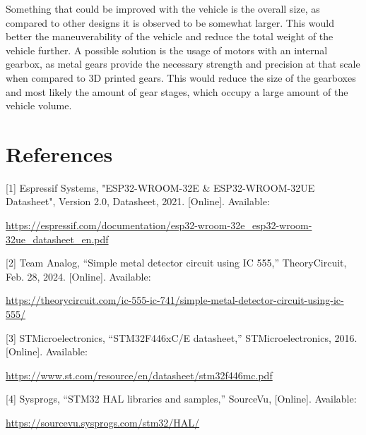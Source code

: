 \documentclass[11pt]{article}
\begin{document}
Something that could be improved with the vehicle is the overall size, as compared to other designs it is observed to be somewhat larger. This would better the maneuverability of the vehicle and reduce the total weight of the vehicle further. A possible solution is the usage of motors with an internal gearbox, as metal gears provide the necessary strength and precision at that scale when compared to 3D printed gears. This would reduce the size of the gearboxes and most likely the amount of gear stages, which occupy a large amount of the vehicle volume.

\newpage

\section{References}
[1] Espressif Systems, "ESP32-WROOM-32E \& ESP32-WROOM-32UE Datasheet", Version 2.0, Datasheet, 2021. [Online]. Available:
\vspace{-.5\baselineskip}

\href{https://espressif.com/documentation/esp32-wroom-32e_esp32-wroom-32ue_datasheet_en.pdf}{https://espressif.com/documentation/esp32-wroom-32e\_esp32-wroom-32ue\_datasheet\_en.pdf}

[2] Team Analog, “Simple metal detector circuit using IC 555,” TheoryCircuit, Feb. 28, 2024. [Online]. Available:
\vspace{-.5\baselineskip}

\href{https://theorycircuit.com/ic-555-ic-741/simple-metal-detector-circuit-using-ic-555/}{https://theorycircuit.com/ic-555-ic-741/simple-metal-detector-circuit-using-ic-555/}

[3] STMicroelectronics, “STM32F446xC/E datasheet,” STMicroelectronics, 2016. [Online]. Available:
\vspace{-.5\baselineskip}

\href{https://www.st.com/resource/en/datasheet/stm32f446mc.pdf}{https://www.st.com/resource/en/datasheet/stm32f446mc.pdf}

[4] Sysprogs, “STM32 HAL libraries and samples,” SourceVu, [Online]. Available:
\vspace{-.5\baselineskip}

\href{https://sourcevu.sysprogs.com/stm32/HAL/}{https://sourcevu.sysprogs.com/stm32/HAL/}

\newpage
\end{document}
